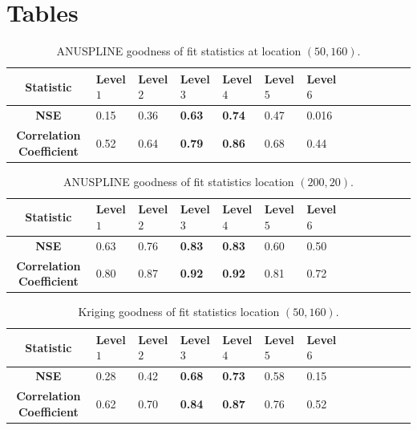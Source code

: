 {\section*{Tables}

\begin{table}[!htbp] 
\caption{ANUSPLINE goodness of fit statistics at location $(50,160)$.}
\vspace*{-0.15in}
\label{table:ANUSP_goddness_50_160}
\vskip4mm
\centering
\begin{tabularx}{\columnwidth}{@{}>{\bfseries}c*{12}{X}@{}}
\hline \hline
 Statistic & Level $1$ & Level $2$ & Level $3$ & Level $4$ & Level $5$ & Level $6$ \\
\hline \hline
NSE & 0.15&0.36&{\bf 0.63}& {\bf 0.74}&0.47&0.016 \\
\hline
Correlation Coefficient  & 0.52&0.64&{\bf 0.79}& {\bf 0.86}&0.68&0.44 \\
\hline
\end{tabularx}
\end{table}

\begin{table}[!htbp] 
\caption{ANUSPLINE goodness of fit statistics location $(200,20)$.}
\vspace*{-0.15in}
\label{table:ANUSP_goddness_200_20}
\vskip4mm
\centering
\begin{tabularx}{\columnwidth}{@{}>{\bfseries}c*{12}{X}@{}}
\hline \hline
 Statistic & Level $1$ & Level $2$ & Level $3$ & Level $4$ & Level $5$ & Level $6$ \\
\hline \hline
NSE & 0.63&0.76& {\bf 0.83}& {\bf 0.83}&0.60&0.50 \\
\hline
Correlation Coefficient & 0.80&0.87&{\bf 0.92}& {\bf 0.92}&0.81&0.72 \\
\hline
\end{tabularx}
\end{table}

\begin{table}[!htbp] 
\caption{Kriging goodness of fit statistics location $(50,160)$.}
\vspace*{-0.15in}
\label{table:Krig_goddness_50_160}
\vskip4mm
\centering
\begin{tabularx}{\columnwidth}{@{}>{\bfseries}c*{12}{X}@{}}
\hline \hline
 Statistic & Level $1$ & Level $2$ & Level $3$ & Level $4$ & Level $5$ & Level $6$ \\
\hline \hline
NSE & 0.28&0.42&{\bf 0.68}&{\bf 0.73}&0.58&0.15 \\
\hline
Correlation Coefficient &0.62&0.70&{ \bf 0.84}& {\bf 0.87}&0.76&0.52 \\
\hline
\end{tabularx}
\end{table}

}
